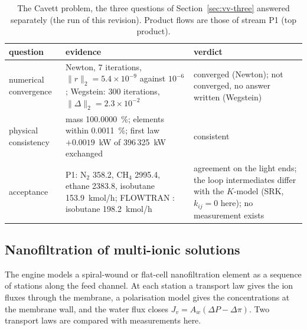 \documentclass[preprint,12pt]{elsarticle}
\begin{document}
\begin{table}[t]
\centering\scriptsize
\caption{The Cavett problem, the three questions of
Section~\ref{sec:vv-three} answered separately (the run of this revision).
Product flows are those of stream P1 (top product).}
\label{tab:cavett}
\begin{tabular}{p{3.0cm}p{5.6cm}p{5.0cm}}
\toprule
\textbf{question} & \textbf{evidence} & \textbf{verdict} \\
\midrule
numerical convergence & Newton, 7 iterations, $\|r\|_2 = 5.4\times10^{-9}$
  against $10^{-6}$; Wegstein: 300 iterations, $\|\Delta\|_2 = 2.3\times10^{-2}$
  & converged (Newton); not converged, no answer written (Wegstein) \\
physical consistency & mass 100.0000~\%; elements within 0.0011~\%;
  first law $+0.0019$~kW of 396\,325~kW exchanged & consistent \\
acceptance & P1: N$_2$ 358.2, CH$_4$ 2995.4, ethane 2383.8, isobutane
  153.9~kmol/h; FLOWTRAN \citep{rosen1977}: isobutane 198.2~kmol/h &
  agreement on the light ends; the loop intermediates differ with the
  $K$-model (SRK, $k_{ij}=0$ here); no measurement exists \\
\bottomrule
\end{tabular}
\end{table}

\subsection{Nanofiltration of multi-ionic solutions}
\label{sec:ex-research}

The engine models a spiral-wound or flat-cell nanofiltration element as a
sequence of stations along the feed channel.  At each station a transport
law gives the ion fluxes through the membrane, a polarisation model gives
the concentrations at the membrane wall, and the water flux closes
$J_v = A_w(\Delta P - \Delta\pi)$.  Two transport laws are compared with
measurements here.
\end{document}
